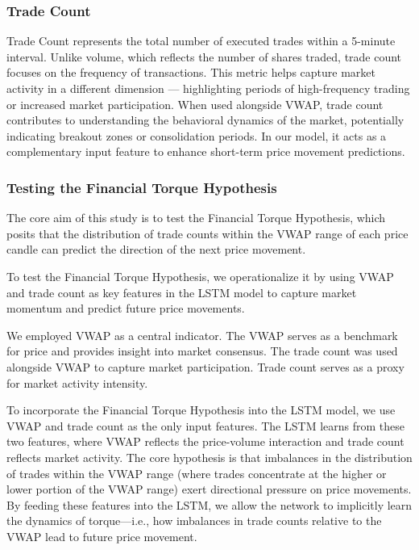 \documentclass[letterpaper]{article}
\begin{document}
\subsubsection{Trade Count}

Trade Count represents the total number of executed trades within a 5-minute interval. Unlike volume, which reflects the number of shares traded, trade count focuses on the frequency of transactions. This metric helps capture market activity in a different dimension — highlighting periods of high-frequency trading or increased market participation. When used alongside VWAP, trade count contributes to understanding the behavioral dynamics of the market, potentially indicating breakout zones or consolidation periods. In our model, it acts as a complementary input feature to enhance short-term price movement predictions.

\subsubsection{Testing the Financial Torque Hypothesis}

The core aim of this study is to test the Financial Torque Hypothesis, which posits that the distribution of trade counts within the VWAP range of each price candle can predict the direction of the next price movement.

To test the Financial Torque Hypothesis, we operationalize it by using VWAP and trade count as key features in the LSTM model to capture market momentum and predict future price movements.

We employed VWAP as a central indicator. The VWAP serves as a benchmark for price and provides insight into market consensus. The trade count was used alongside VWAP to capture market participation. Trade count serves as a proxy for market activity intensity.

To incorporate the Financial Torque Hypothesis into the LSTM model, we use VWAP and trade count as the only input features. The LSTM learns from these two features, where VWAP reflects the price-volume interaction and trade count reflects market activity. The core hypothesis is that imbalances in the distribution of trades within the VWAP range (where trades concentrate at the higher or lower portion of the VWAP range) exert directional pressure on price movements. By feeding these features into the LSTM, we allow the network to implicitly learn the dynamics of torque—i.e., how imbalances in trade counts relative to the VWAP lead to future price movement.
\end{document}
